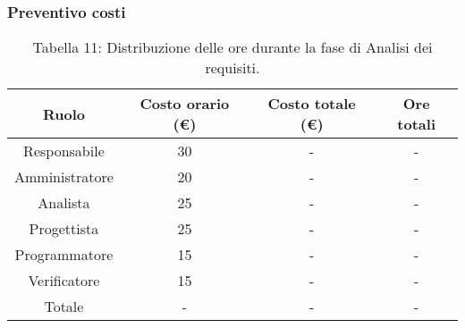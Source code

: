 \vspace{100pt}
\subsubsection{Preventivo costi}
\begin{table}[h]
	\setlength\extrarowheight{5pt}
	\centering
	\begin{tabularx}{\textwidth}{|c|c|c|c|}
		\hline
		\textbf{Ruolo} & \textbf{Costo orario (€)} & \textbf{Costo totale (€)} &\textbf{Ore totali}\\
		\hline
		Responsabile &30&-&- \\
		\hline
		Amministratore &20&-&- \\
		\hline
		Analista &25&-&- \\
		\hline
		Progettista &25&-&- \\
		\hline
		Programmatore &15&-&- \\
		\hline
		Verificatore &15&-&- \\
		\hline
		Totale &-&-&-\\
		\hline
	\end{tabularx}
    \vspace{10pt}
	\caption{Tabella 11: Distribuzione delle ore durante la fase di Analisi dei requisiti.}
\end{table}
